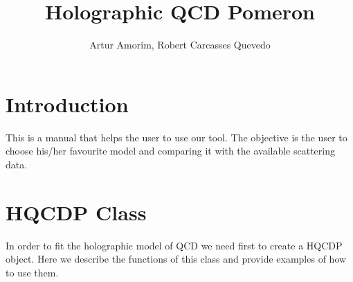 \documentclass{book}
\begin{document}
\title{Holographic QCD Pomeron}
\author{Artur Amorim, Robert Carcasses Quevedo}
\maketitle
\tableofcontents

\chapter{Introduction}
This is a manual that helps the user to use our tool. The objective is the user to choose his/her favourite model and comparing it with the available scattering data.

\chapter{HQCDP Class}
In order to fit the holographic model of QCD we need first to create a HQCDP object. Here we describe the functions of this class and provide examples of how to use them.
\end{document}
